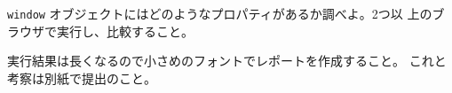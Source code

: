 \begin{Prob}\upshape
\Verb+window+ オブジェクトにはどのようなプロパティがあるか調べよ。2つ以
 上のブラウザで実行し、比較すること。
\end{Prob}
\ifText
実行結果は長くなるので小さめのフォントでレポートを作成すること。
これと考察は別紙で提出のこと。
\fi
